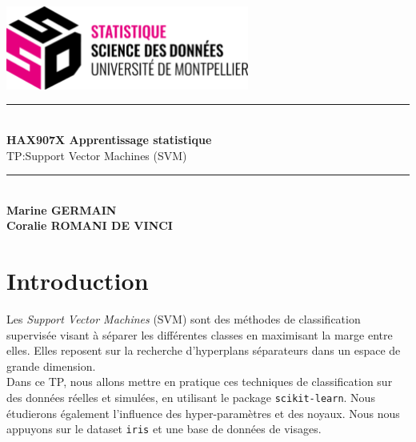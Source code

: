 \documentclass[a4paper,12pt]{article}
\begin{document}
\begin{titlepage}

    \vspace*{4cm}

    \centering
    
    \includegraphics[width=0.6\textwidth]{Images/logo.png} \\[1.5cm]
    
    \rule{\linewidth}{1pt} \\[1cm]

    {\Huge \bfseries HAX907X Apprentissage statistique}\\[0.5cm]
    {\Huge TP:Support Vector Machines (SVM)}\\[1cm]
    
    \rule{\linewidth}{1pt} \\[2cm]

    {\Large \textbf{Marine GERMAIN}}\\
    {\Large \textbf{Coralie ROMANI DE VINCI}}\\[1cm]
    

\end{titlepage}


\renewcommand{\contentsname}{Table des matières}
\tableofcontents


\newpage

\section{Introduction}
 
Les \emph{Support Vector Machines} (SVM) sont des méthodes de classification supervisée visant à séparer les différentes classes en maximisant la marge entre elles. Elles reposent sur la recherche d'hyperplans séparateurs dans un espace de grande dimension.\\

Dans ce TP, nous allons mettre en pratique ces techniques de classification sur des données réelles et simulées, en utilisant le package \texttt{scikit-learn}. 
Nous étudierons également l'influence des hyper-paramètres et des noyaux.
Nous nous appuyons sur le dataset \texttt{iris} et une base de données de visages. 
\end{document}
